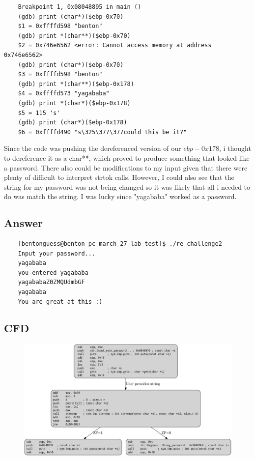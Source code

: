 \documentclass[11pt]{article}
\begin{document}
\begin{lstlisting}
    Breakpoint 1, 0x08048895 in main ()
    (gdb) print (char*)($ebp-0x70)
    $1 = 0xffffd598 "benton"
    (gdb) print *(char**)($ebp-0x70)
    $2 = 0x746e6562 <error: Cannot access memory at address 0x746e6562>
    (gdb) print (char*)($ebp-0x70)
    $3 = 0xffffd598 "benton"
    (gdb) print *(char**)($ebp-0x178)
    $4 = 0xffffd573 "yagababa"
    (gdb) print *(char*)($ebp-0x178)
    $5 = 115 's'
    (gdb) print (char*)($ebp-0x178)
    $6 = 0xffffd490 "s\325\377\377could this be it?"
\end{lstlisting}

Since the code was pushing the dereferenced version of our $ebp - 0x178$, i thought to dereference it as a char**, which proved to produce something that looked like a password. There also could be modifications to my input given that there were plenty of difficult to interpret strtok calls. However, I could also see that the string for my password was not being changed so it was likely that all i needed to do was match the string. I was lucky since "yagababa" worked as a password.

\subsection*{Answer}

\begin{lstlisting}
    [bentonguess@benton-pc march_27_lab_test]$ ./re_challenge2
    Input your password... 
    yagababa
    you entered yagababa 
    yagababaZ0ZMQUdmbGF
    yagababa
    You are great at this :)
\end{lstlisting}

\subsection*{CFD}
\begin{figure}[H]
    \centering
    \includegraphics[width=0.99\linewidth]{./graphviz/challenge2.png}
\end{figure}
\end{document}

